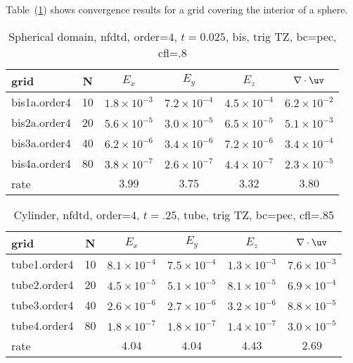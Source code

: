 Table~(\ref{table:mx.bis}) shows convergence results for a grid covering the interior
of a sphere.
\begin{table}[hbt]
\begin{center}
\begin{tabular}{|l|c|c|c|c|c|} \hline\hline 
grid  & N &  $E_x$ &  $E_y$ & $E_z$ & $\grad\cdot\uv$\\ \hline 
        bis1a.order4 &    10 &  $1.8\times10^{ -3}$  &  $7.2\times10^{ -4}$  &  $4.5\times10^{ -4}$  &  $6.2\times10^{ -2}$   \\ \hline
        bis2a.order4 &    20 &  $5.6\times10^{ -5}$  &  $3.0\times10^{ -5}$  &  $6.5\times10^{ -5}$  &  $5.1\times10^{ -3}$   \\ \hline
        bis3a.order4 &    40 &  $6.2\times10^{ -6}$  &  $3.4\times10^{ -6}$  &  $7.2\times10^{ -6}$  &  $3.4\times10^{ -4}$   \\ \hline
        bis4a.order4 &    80 &  $3.8\times10^{ -7}$  &  $2.6\times10^{ -7}$  &  $4.4\times10^{ -7}$  &  $2.3\times10^{ -5}$   \\ \hline
    rate            &     &       $3.99$ &       $3.75$ &       $3.32$ &       $3.80$  \\ \hline\hline
\end{tabular}
\caption{Spherical domain, nfdtd, order=$4$, $t=0.025$, bis, trig TZ, bc=pec, cfl=.8}\label{table:mx.bis}
\end{center}
\end{table}

\begin{table}[hbt]
\begin{center}
\begin{tabular}{|l|c|c|c|c|c|} \hline\hline 
grid  & N &  $E_x$ &  $E_y$ & $E_z$ & $\grad\cdot\uv$\\ \hline 
        tube1.order4 &    10 &  $8.1\times10^{ -4}$  &  $7.5\times10^{ -4}$  &  $1.3\times10^{ -3}$  &  $7.6\times10^{ -3}$   \\ \hline
        tube2.order4 &    20 &  $4.5\times10^{ -5}$  &  $5.1\times10^{ -5}$  &  $8.1\times10^{ -5}$  &  $6.9\times10^{ -4}$   \\ \hline
        tube3.order4 &    40 &  $2.6\times10^{ -6}$  &  $2.7\times10^{ -6}$  &  $3.2\times10^{ -6}$  &  $8.8\times10^{ -5}$   \\ \hline
        tube4.order4 &    80 &  $1.8\times10^{ -7}$  &  $1.8\times10^{ -7}$  &  $1.4\times10^{ -7}$  &  $3.0\times10^{ -5}$   \\ \hline
    rate            &     &       $4.04$ &       $4.04$ &       $4.43$ &       $2.69$  \\ \hline\hline
\end{tabular}
\caption{Cylinder, nfdtd, order=$4$, $t=.25$, tube, trig TZ, bc=pec, cfl=.85}\label{table:mx.tube}
\end{center}
\end{table}

